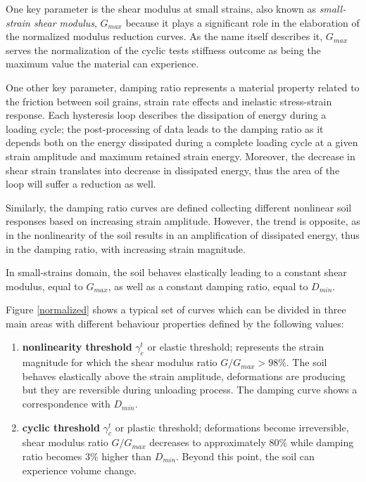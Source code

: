 \documentclass[12pt,a4paper]{report}
\begin{document}
One key parameter is the shear modulus at small strains, also known as \textit{small-strain shear modulus}, $G_{max}$ because it plays a significant role in the elaboration of the normalized modulus reduction curves. As the name itself describes it, $G_{max}$ serves the normalization of the cyclic tests stiffness outcome as being the maximum value the material can experience. 

One other key parameter, damping ratio represents a material property related to the friction between soil grains, strain rate effects and inelastic stress-strain response. Each hysteresis loop describes the dissipation of energy during a loading cycle; the post-processing of data leads to the damping ratio as it depends both on the energy dissipated during a complete loading cycle at a given strain amplitude and maximum retained strain energy. Moreover, the decrease in shear strain translates into decrease in dissipated energy, thus the area of the loop will suffer a reduction as well. 

Similarly, the damping ratio curves are defined collecting different nonlinear soil responses based on increasing strain amplitude. However, the trend is opposite, as in the nonlinearity of the soil results in an amplification of dissipated energy, thus in the damping ratio,  with increasing strain magnitude. 

In small-strains domain, the soil behaves elastically leading to a constant shear modulus, equal to $G_{max}$, as well as a constant damping ratio, equal to $D_{min}$.

Figure \ref{normalized} shows a typical set of curves which can be divided in three main areas with different behaviour properties defined by the following values:
\begin{enumerate}
	\item \textbf{nonlinearity threshold} $\gamma_e^t$ or elastic threshold; represents the strain magnitude for which the shear modulus ratio $G/G_{max}>98\%$. The soil behaves elastically above the strain amplitude, deformations are producing but they are reversible during unloading process. The damping curve shows a correspondence with $D_{min}$. 
	\item \textbf{cyclic threshold} $\gamma_c^t$ or plastic threshold; deformations become irreversible, shear modulus ratio $G/G_{max}$ decreases to approximately 80\% while damping ratio becomes 3\% higher than $D_{min}$. Beyond this point, the soil can experience volume change. 
\end{enumerate}
\end{document}

